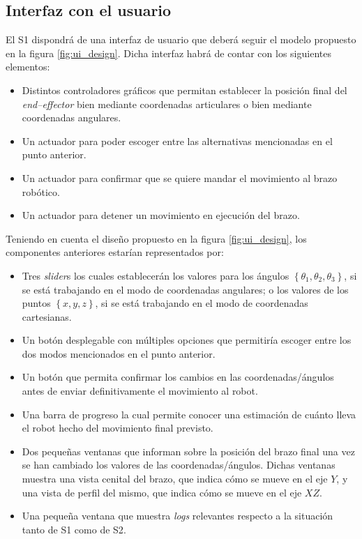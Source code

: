 \subsection{Interfaz con el usuario}
\label{sec:ui_reqs}
El \ac{S1} dispondrá de una interfaz de usuario que deberá seguir el modelo propuesto en la figura \ref{fig:ui_design}. Dicha interfaz habrá de contar con los siguientes elementos:
\begin{itemize}
    \item Distintos controladores gráficos que permitan establecer la posición final del \textit{end--effector} bien mediante coordenadas articulares o bien mediante coordenadas angulares.
    \item Un actuador para poder escoger entre las alternativas mencionadas en el punto anterior.
    \item Un actuador para confirmar que se quiere mandar el movimiento al brazo robótico.
    \item Un actuador para detener un movimiento en ejecución del brazo.
\end{itemize}

Teniendo en cuenta el diseño propuesto en la figura \ref{fig:ui_design}, los componentes anteriores estarían
representados por:

\begin{itemize}
    \item Tres \textit{slider}s los cuales establecerán los valores para los ángulos 
    $\left\{\theta_1, \theta_2, \theta_3\right\}$, si se está trabajando en el modo de coordenadas
    angulares; o los valores de los puntos $\left\{x, y, z\right\}$, si se está trabajando en el modo
    de coordenadas cartesianas.
    \item Un botón desplegable con múltiples opciones que permitiría escoger entre los dos modos
    mencionados en el punto anterior.
    \item Un botón que permita confirmar los cambios en las coordenadas/ángulos antes de enviar
    definitivamente el movimiento al robot.
    \item Una barra de progreso la cual permite conocer una estimación de cuánto lleva el robot hecho
    del movimiento final previsto.
    \item Dos pequeñas ventanas que informan sobre la posición del brazo final una vez se han
    cambiado los valores de las coordenadas/ángulos. Dichas ventanas muestra una vista cenital del
    brazo, que indica cómo se mueve en el eje $Y$, y una vista de perfil del mismo, que indica cómo
    se mueve en el eje $XZ$.
    \item Una pequeña ventana que muestra \textit{logs} relevantes respecto a la situación tanto
    de \ac{S1} como de \ac{S2}.
\end{itemize}
